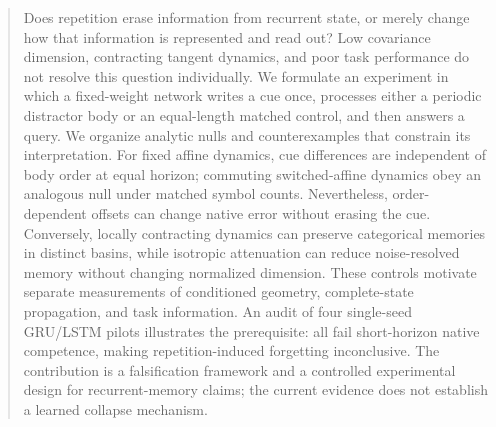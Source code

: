\begin{abstract}
Does repetition erase information from recurrent state, or merely change how that information is represented and read out? Low covariance dimension, contracting tangent dynamics, and poor task performance do not resolve this question individually. We formulate an experiment in which a fixed-weight network writes a cue once, processes either a periodic distractor body or an equal-length matched control, and then answers a query. We organize analytic nulls and counterexamples that constrain its interpretation. For fixed affine dynamics, cue differences are independent of body order at equal horizon; commuting switched-affine dynamics obey an analogous null under matched symbol counts. Nevertheless, order-dependent offsets can change native error without erasing the cue. Conversely, locally contracting dynamics can preserve categorical memories in distinct basins, while isotropic attenuation can reduce noise-resolved memory without changing normalized dimension. These controls motivate separate measurements of conditioned geometry, complete-state propagation, and task information. An audit of four single-seed GRU/LSTM pilots illustrates the prerequisite: all fail short-horizon native competence, making repetition-induced forgetting inconclusive. The contribution is a falsification framework and a controlled experimental design for recurrent-memory claims; the current evidence does not establish a learned collapse mechanism.
\end{abstract}
